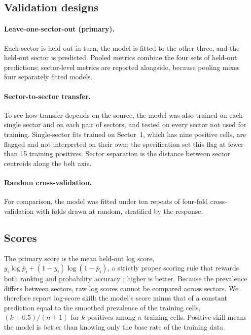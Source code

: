 \documentclass[pdflatex,sn-basic]{sn-jnl}%
\begin{document}
\subsection{Validation designs}
\label{sec:designs}

\paragraph{Leave-one-sector-out (primary).} Each sector is held out in turn, the model is fitted to the other three, and the held-out sector is predicted. Pooled metrics combine the four sets of held-out predictions; sector-level metrics are reported alongside, because pooling mixes four separately fitted models.

\paragraph{Sector-to-sector transfer.} To see how transfer depends on the source, the model was also trained on each single sector and on each pair of sectors, and tested on every sector not used for training. Single-sector fits trained on Sector~1, which has nine positive cells, are flagged and not interpreted on their own; the specification set this flag at fewer than 15 training positives. Sector separation is the distance between sector centroids along the belt axis.

\paragraph{Random cross-validation.} For comparison, the model was fitted under ten repeats of four-fold cross-validation with folds drawn at random, stratified by the response.

\subsection{Scores}
\label{sec:scores}

The primary score is the mean held-out log score, $y_i\log\bar p_i+(1-y_i)\log(1-\bar p_i)$, a strictly proper scoring rule that rewards both ranking and probability accuracy \citep{Gneiting2007}; higher is better. Because the prevalence differs between sectors, raw log scores cannot be compared across sectors. We therefore report log-score skill: the model's score minus that of a constant prediction equal to the smoothed prevalence of the training cells, $(k+0.5)/(n+1)$ for $k$ positives among $n$ training cells. Positive skill means the model is better than knowing only the base rate of the training data.
\end{document}
